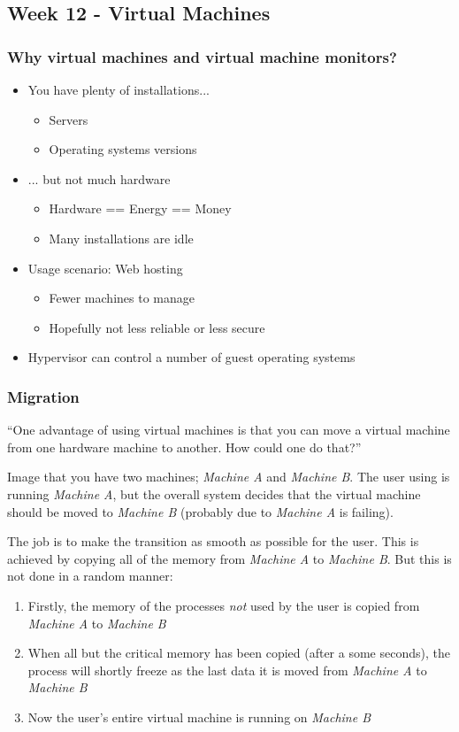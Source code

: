 
\subsection*{Week 12 - Virtual Machines}
\subsubsection*{Why virtual machines and virtual machine monitors?}

\begin{itemize}
	\item You have plenty of installations...
	\begin{itemize}
		\item Servers
		\item Operating systems versions
	\end{itemize}

	\item ... but not much hardware
	\begin{itemize}
		\item Hardware == Energy == Money
		\item Many installations are idle
	\end{itemize}
	\item Usage scenario: Web hosting
	\begin{itemize}
		\item Fewer machines to manage
		\item Hopefully not less reliable or less secure
	\end{itemize}
	\item Hypervisor can control a number of guest operating systems
\end{itemize}

\subsubsection*{Migration}
``One advantage of using virtual machines is that you can move a virtual machine from one hardware machine to another. How could one do that?''

Image that you have two machines; \emph{Machine A} and \emph{Machine B}. The user using is running \emph{Machine A}, but the overall system decides that the virtual machine should be moved to \emph{Machine B} (probably due to \emph{Machine A} is failing).

The job is to make the transition as smooth as possible for the user. This is achieved by copying all of the memory from \emph{Machine A} to \emph{Machine B}. But this is not done in a random manner:
\begin{enumerate}
	\item Firstly, the memory of the processes \emph{not} used by the user is copied from \emph{Machine A} to \emph{Machine B}
	\item When all but the critical memory has been copied (after a some seconds), the process will shortly freeze as the last data it is moved from \emph{Machine A} to \emph{Machine B}
	\item Now the user's entire virtual machine is running on \emph{Machine B}
\end{enumerate}

